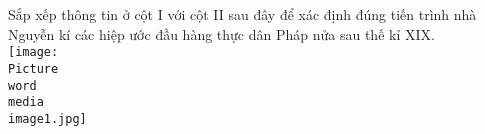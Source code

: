 \documentclass[preview,border=1pt]{standalone}
\begin{document}
	Sắp xếp thông tin ở cột I với cột II sau đây để xác định đúng tiến trình nhà Nguyễn kí các hiệp ước đầu hàng thực dân Pháp nửa sau thế kỉ XIX.\\
	\texttt{[image: \\Picture\\word\\media\\image1.jpg]}
\end{document}
